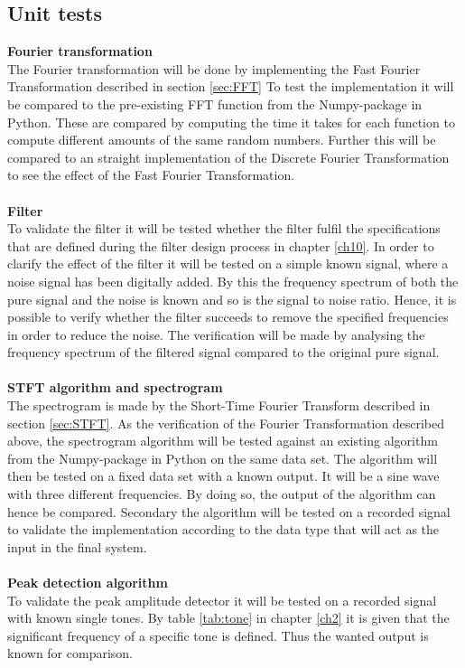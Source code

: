 \subsection{Unit tests} 
\textbf{Fourier transformation} \\
The Fourier transformation will be done by implementing the Fast Fourier Transformation described in section \ref{sec:FFT} 
To test the implementation it will be compared to the pre-existing FFT function from the Numpy-package in Python. These are compared by computing the time it takes for each function to compute different amounts of the same random numbers. Further this will be compared to an straight  implementation of the Discrete Fourier Transformation to see the effect of the Fast Fourier Transformation.\\
\\
\textbf{Filter}\\
To validate the filter it will be tested whether the filter fulfil the specifications that are defined during the filter design process in chapter \ref{ch10}. In order to clarify the effect of the filter it will be tested on a simple known signal, where a noise signal has been digitally added. By this the frequency spectrum of both the pure signal and the noise is known and so is the signal to noise ratio. Hence, it is possible to verify whether the filter succeeds to remove the specified frequencies in order to reduce the noise. The verification will be made by analysing the frequency spectrum of the filtered signal compared to the original pure signal. \\
\\
\textbf{STFT algorithm and spectrogram}\\
The spectrogram is made by the Short-Time Fourier Transform described in section \ref{sec:STFT}. As the verification of the Fourier Transformation described above, the spectrogram algorithm will be tested against an existing algorithm from the Numpy-package in Python on the same data set.
The algorithm will then be tested on a fixed data set with a known output. It will be a sine wave with three different frequencies. By doing so, the output of the algorithm can hence be compared.
Secondary the algorithm will be tested on a recorded signal to validate the implementation according to the data type that will act as the input in the final system. 
\\
\\
\textbf{Peak detection algorithm}\\
To validate the peak amplitude detector it will be tested on a recorded signal with known single tones. By table \ref{tab:tone} in chapter \ref{ch2} it is given that the significant frequency of a specific tone is defined. Thus the wanted output is known for comparison.         


